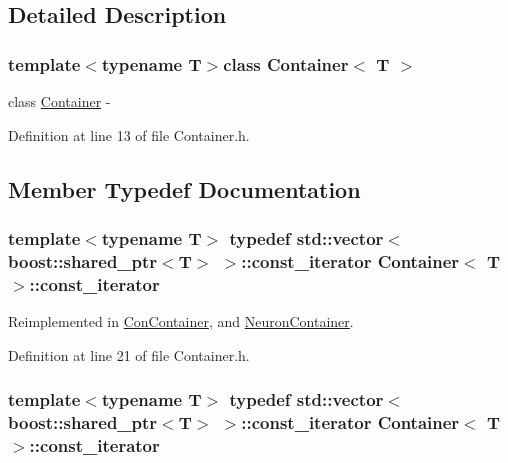 \subsection{Detailed Description}
\subsubsection*{template$<$typename T$>$class Container$<$ T $>$}

class \hyperlink{class_container}{Container} -\/ 

Definition at line 13 of file Container.h.



\subsection{Member Typedef Documentation}
\hypertarget{class_container_a5eabadaffdd508cb623c955eb0af1518}{
\subsubsection[{const\_\-iterator}]{\setlength{\rightskip}{0pt plus 5cm}template$<$typename T$>$ typedef std::vector$<$boost::shared\_\-ptr$<$T$>$ $>$::{\bf const\_\-iterator} {\bf Container}$<$ T $>$::{\bf const\_\-iterator}}}
\label{class_container_a5eabadaffdd508cb623c955eb0af1518}


Reimplemented in \hyperlink{class_con_container_ac314ee4e351b3a5f595cd1de74fb3b5e}{ConContainer}, and \hyperlink{class_neuron_container_a41749602f05e7610da7f0f1fd59f5442}{NeuronContainer}.



Definition at line 21 of file Container.h.

\hypertarget{class_container_a5eabadaffdd508cb623c955eb0af1518}{
\subsubsection[{const\_\-iterator}]{\setlength{\rightskip}{0pt plus 5cm}template$<$typename T$>$ typedef std::vector$<$boost::shared\_\-ptr$<$T$>$ $>$::{\bf const\_\-iterator} {\bf Container}$<$ T $>$::{\bf const\_\-iterator}}}
\label{class_container_a5eabadaffdd508cb623c955eb0af1518}


